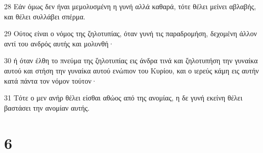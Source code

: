 \par 28 Εάν όμως δεν ήναι μεμολυσμένη η γυνή αλλά καθαρά, τότε θέλει μείνει αβλαβής, και θέλει συλλάβει σπέρμα.
\par 29 Ούτος είναι ο νόμος της ζηλοτυπίας, όταν γυνή τις παραδρομήση, δεχομένη άλλον αντί του ανδρός αυτής και μολυνθή·
\par 30 ή όταν έλθη το πνεύμα της ζηλοτυπίας εις άνδρα τινά και ζηλοτυπήση την γυναίκα αυτού και στήση την γυναίκα αυτού ενώπιον του Κυρίου, και ο ιερεύς κάμη εις αυτήν κατά πάντα τον νόμον τούτον·
\par 31 Τότε ο μεν ανήρ θέλει είσθαι αθώος από της ανομίας, η δε γυνή εκείνη θέλει βαστάσει την ανομίαν αυτής.

\chapter{6}


